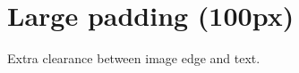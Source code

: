 \documentclass{article}
\begin{document}
\section*{Large padding (100px)}

Extra clearance between image edge and text.

\lipsum[1-8]
\end{document}
